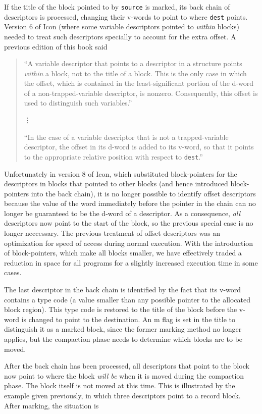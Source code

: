 If the title of the block pointed to by \texttt{source} is marked, its
back chain of descriptors is processed, changing their v-words to
point to where \texttt{dest} points. 
Version 6 of Icon (where some variable descriptors pointed to {\em
  within} blocks) needed to treat such descriptors specially to
account for the extra offset. A previous edition of this book said
\begin{quote}
``A variable descriptor that points to a descriptor in a structure
points \textit{within} a block, not to the title of a block. This is
the only case in which the offset, which is contained in the
least-significant portion of the d-word of a non-trapped-variable
descriptor, is nonzero. Consequently, this offset is used to
distinguish such variables.''

\hspace*{2.5in} \vdots

``In the case of a variable descriptor that is not a trapped-variable
descriptor, the offset in its d-word is added to its v-word, so that
it points to the appropriate relative position with respect to
\texttt{dest}.''
\end{quote}
Unfortunately in version 8 of Icon, which substituted block-pointers
for the descriptors in blocks that pointed to other blocks (and hence
introduced block-pointers into the back chain), it is no longer
possible to identify offset descriptors because the value of the word
immediately before the pointer in the chain can no longer be
guaranteed to be the d-word of a descriptor. As a consequence, {\em
  all} descriptors now point to the start of the block, so the
previous special case is no longer neccessary. The previous treatment
of offset descriptors was an optimization for speed of access during
normal execution. With the introduction of block-pointers, which make
all blocks smaller, we have effectively traded a reduction in space
for all programs for a slightly increased execution time in some
cases.

The last descriptor in the back chain is identified by the fact that
its v-word contains a type code (a value smaller than any possible
pointer to the allocated block region). This type code is restored to
the title of the block before the v-word is changed to point to the
destination. An m flag is set in the title to distinguish it as a
marked block, since the former marking method no longer applies, but
the compaction phase needs to determine which blocks are to be moved.

After the back chain has been processed, all descriptors that point to
the block now point to where the block \textit{will be }when it is
moved during the compaction phase. The block itself is not moved at
this time. This is illustrated by the example given previously, in
which three descriptors point to a record block. After marking, the
situation is

